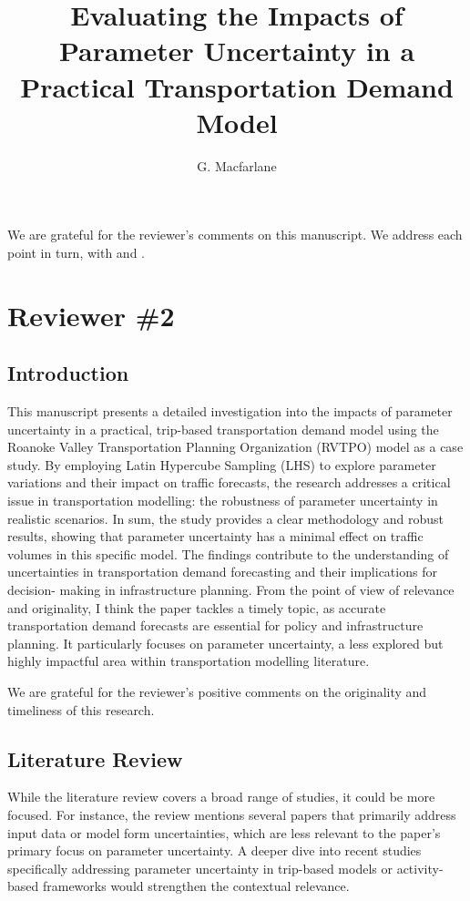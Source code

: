 \documentclass{ar2rc}
\title{Evaluating the Impacts of Parameter Uncertainty in a Practical Transportation Demand Model}
\author{G. Macfarlane}
\begin{document}
\maketitle

We are grateful for the reviewer's comments on this manuscript. We address each point in turn, with 
\DIFaddbegin {}\DIFaddend  and 
\DIFdelbegin {}\DIFdelend.


\section{Reviewer \#2}

\subsection{Introduction}
\RC This manuscript presents a detailed investigation into the impacts of parameter uncertainty
in a practical, trip-based transportation demand model using the Roanoke Valley
Transportation Planning Organization (RVTPO) model as a case study. By employing Latin
Hypercube Sampling (LHS) to explore parameter variations and their impact on traffic
forecasts, the research addresses a critical issue in transportation modelling: the
robustness of parameter uncertainty in realistic scenarios. In sum, the study provides a
clear methodology and robust results, showing that parameter uncertainty has a minimal
effect on traffic volumes in this specific model. The findings contribute to the understanding
of uncertainties in transportation demand forecasting and their implications for decision-
making in infrastructure planning.
From the point of view of relevance and originality, I think the paper tackles a timely topic,
as accurate transportation demand forecasts are essential for policy and infrastructure
planning. It particularly focuses on parameter uncertainty, a less explored but highly
impactful area within transportation modelling literature.

\AR We are grateful for the reviewer's positive comments on the originality and timeliness 
of this research.

\subsection{Literature Review}
\RC While the literature review covers a broad range of studies, it could be more focused. For
instance, the review mentions several papers that primarily address input data or model
form uncertainties, which are less relevant to the paper’s primary focus on parameter
uncertainty. A deeper dive into recent studies specifically addressing parameter
uncertainty in trip-based models or activity-based frameworks would strengthen the
contextual relevance.
\end{document}
